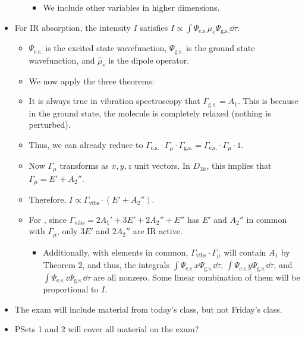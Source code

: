 \documentclass[../notes.tex]{subfiles}
\begin{document}
\begin{itemize}
\begin{itemize}
\begin{itemize}
            \item We include other variables in higher dimensions.
        \end{itemize}
    \end{itemize}
    \item For IR absorption, the intensity $I$ satisfies $I\propto\int\Psi_\text{e.s.}\hat{\mu}_e\Psi_\text{g.s.}\dd{\tau}$.
    \begin{itemize}
        \item $\Psi_\text{e.s.}$ is the excited state wavefunction, $\Psi_\text{g.s.}$ is the ground state wavefunction, and $\hat{\mu}_e$ is the dipole operator.
        \item We now apply the three theorems:
        \item It is always true in vibration spectroscopy that $\Gamma_\text{g.s.}=A_1$. This is because in the ground state, the molecule is completely relaxed (nothing is perturbed).
        \item Thus, we can already reduce to $\Gamma_\text{e.s.}\cdot\Gamma_\mu\cdot\Gamma_\text{g.s.}=\Gamma_\text{e.s.}\cdot\Gamma_\mu\cdot 1$.
        \item Now $\Gamma_\mu$ transforms as $x,y,z$ unit vectors. In $D_{3h}$, this implies that $\Gamma_\mu=E'+A_2''$.
        \item Therefore, $I\propto\Gamma_\text{vibs}\cdot(E'+A_2'')$.
        \item For , since $\Gamma_\text{vibs}=2A_1'+3E'+2A_2''+E''$ has $E'$ and $A_2''$ in common with $\Gamma_\mu$, only $3E'$ and $2A_2''$ are IR active.
        \begin{itemize}
            \item Additionally, with elements in common, $\Gamma_\text{vibs}\cdot\Gamma_\mu$ will contain $A_1$ by Theorem 2, and thus, the integrals $\int\Psi_\text{e.s.}x\Psi_\text{g.s.}\dd{\tau}$, $\int\Psi_\text{e.s.}y\Psi_\text{g.s.}\dd{\tau}$, and $\int\Psi_\text{e.s.}z\Psi_\text{g.s.}\dd{\tau}$ are all nonzero. Some linear combination of them will be proportional to $I$.
        \end{itemize}
    \end{itemize}
    \item The exam will include material from today's class, but not Friday's class.
    \item PSets 1 and 2 will cover all material on the exam?
\end{itemize}
\end{document}
